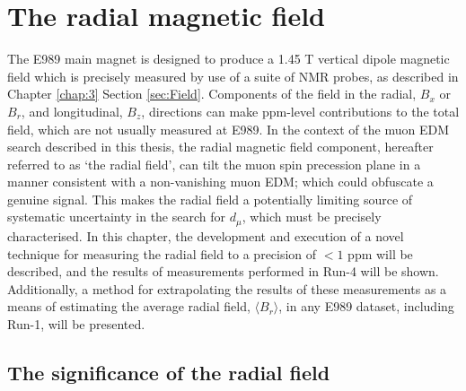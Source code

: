 
\chapter{The radial magnetic field}\label{chap:4}

The E989 main magnet is designed to produce a 1.45 T vertical dipole magnetic field which is precisely measured by use of a suite of NMR probes, as described in Chapter \ref{chap:3} Section \ref{sec:Field}. Components of the field in the radial, $B_{x}$ or $B_{r}$, and longitudinal, $B_{z}$, directions can make ppm-level contributions to the total field, which are not usually measured at E989. In the context of the muon EDM search described in this thesis, the radial magnetic field component, hereafter referred to as `the radial field', can tilt the muon spin precession plane in a manner consistent with a non-vanishing muon EDM; which could obfuscate a genuine signal. This makes the radial field a potentially limiting source of systematic uncertainty in the search for $d_{\mu}$, which must be precisely characterised. In this chapter, the development and execution of a novel technique for measuring the radial field to a precision of $<1$ ppm will be described, and the results of measurements performed in Run-4 will be shown. Additionally, a method for extrapolating the results of these measurements as a means of estimating the average radial field, $\langle B_{r} \rangle$, in any E989 dataset, including Run-1, will be presented.

\section{The significance of the radial field}

